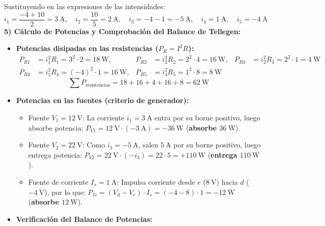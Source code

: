 \begin{ejercicio}
\begin{equation}
\end{equation}
Sustituyendo en las expresiones de las intensidades:
\begin{equation}
    \boxed{i_1 = \frac{-4 + 10}{2} = 3\ \si{\ampere}, \quad i_2 = \frac{10}{5} = 2\ \si{\ampere}, \quad i_3 = -4 - 1 = -5\ \si{\ampere}, \quad i_4 = 1\ \si{\ampere}, \quad i_5 = -4\ \si{\ampere}}
\end{equation}
\textbf{5) Cálculo de Potencias y Comprobación del Balance de Tellegen:}
\begin{itemize}[leftmargin=*]
    \item \textbf{Potencias disipadas en las resistencias ($P_R = I^2 R$):}
    \begin{align*}
        P_{R1} &= i_1^2 R_1 = 3^2 \cdot 2 = 18\ \si{\watt}, &
        P_{R2} &= i_2^2 R_2 = 2^2 \cdot 4 = 16\ \si{\watt}, &
        P_{R3} &= i_2^2 R_3 = 2^2 \cdot 1 = 4\ \si{\watt} \\
        P_{R4} &= i_5^2 R_4 = (-4)^2 \cdot 1 = 16\ \si{\watt}, &
        P_{R5} &= i_4^2 R_5 = 1^2 \cdot 8 = 8\ \si{\watt}
    \end{align*}
    \begin{equation}
        \sum P_{\text{resistencias}} = 18 + 16 + 4 + 16 + 8 = 62\ \si{\watt}
    \end{equation}
    \item \textbf{Potencias en las fuentes (criterio de generador):}
    \begin{itemize}
        \item Fuente $V_1 = 12\ \si{\volt}$: La corriente $i_1 = 3\ \si{\ampere}$ entra por su borne positivo, luego absorbe potencia:
        $P_{V1} = 12\ \si{\volt} \cdot (-3\ \si{\ampere}) = -36\ \si{\watt}$ (\textbf{absorbe $36\ \si{\watt}$}).
        \item Fuente $V_2 = 22\ \si{\volt}$: Como $i_3 = -5\ \si{\ampere}$, salen $5\ \si{\ampere}$ por su borne positivo, luego entrega potencia:
        $P_{V2} = 22\ \si{\volt} \cdot (-i_3) = 22 \cdot 5 = +110\ \si{\watt}$ (\textbf{entrega $110\ \si{\watt}$}).
        \item Fuente de corriente $I_s = 1\ \si{\ampere}$: Impulsa corriente desde $e$ ($8\ \si{\volt}$) hacia $d$ ($-4\ \si{\volt}$), por lo que:
        $P_{Is} = (V_d - V_e) \cdot I_s = (-4 - 8) \cdot 1 = -12\ \si{\watt}$ (\textbf{absorbe $12\ \si{\watt}$}).
    \end{itemize}
    \item \textbf{Verificación del Balance de Potencias:}
    \begin{equation}

\end{equation}
\end{itemize}
\end{ejercicio}
